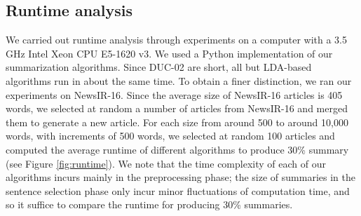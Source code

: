 \documentclass[a4paper,twoside]{article}
\begin{document}
\begin{comment}
\begin{table}[h]
\begin{center}
\begin{tabular}{l|c|c|c|c}
\hline
\multirow{2}{*}{\bf Methods} &
\multicolumn{2}{c}{\bf WED}  & \multicolumn{2}{|c}{\bf WEP} \\
\cline{2-5}
& 30\% & 50\% & 30\% &50\% \\
\hline
\bf ET3Rank &\bf 23.35 &\bf 23.55   &\bf 11.36 &11.38 \\
ESRAKE      &23.22      &23.08      &11.31      &11.34 \\
EPRAKE      &23.06      &23.25      &11.21      &11.31  \\
ET2RAKE     &23.08      &23.38      &11.24      &  11.33\\
ELDARAKE    &23.25      &\bf 23.55  &11.26      &\bf 11.42  \\
PRAKE       &23.06      &23.25      &11.21      &11.31 \\
T2RAKE      &23.18      &23.18      &11.23      &11.34 \\
LDARAKE     &23.25      &23.28      &11.32      &11.33\\
\hline
\end{tabular}
\caption{\label{other} Scores (\%) of GoogleNews-based WED and WEP on 30\% and 50\% summaries over NewsIR-16}
\end{center}
\end{table}
\end{comment}

\subsection{Runtime analysis}

We carried out runtime analysis through experiments on a computer with a 3.5 GHz Intel Xeon CPU E5-1620 v3. %
We used a Python implementation of our summarization algorithms. %
Since DUC-02 are short, all but LDA-based algorithms run in about the same time.
To obtain a finer distinction, we ran our experiments on NewsIR-16. Since the average size of NewsIR-16 articles is 405 words,
we selected at random a number of articles from NewsIR-16 and merged them to generate a new article.
For each size from around 500 to around 10,000 words, with increments of 500 words, we selected at random 100 articles and
computed the average runtime of different algorithms to produce 30\% summary (see Figure \ref{fig:runtime}).
We note that the time complexity of each of our algorithms incurs mainly in
the preprocessing phase; %
the size of summaries in the sentence selection phase only incur minor fluctuations of computation time, and
so it suffice to compare the runtime for producing 30\% summaries.
\end{document}
